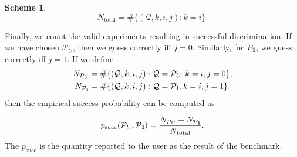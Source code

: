 \documentclass[preprint,12pt, a4paper, dvipsnames]{elsarticle}
\newcommand{\1}{{\rm 1\hspace{-0.9mm}l}}
\newcommand{\Id}{{\rm 1\hspace{-0.9mm}l}}
\newcommand{\PP}{\mathcal{P}}
\newcommand{\QQ}{\mathcal{Q}}
\theoremstyle{definition}
\newtheorem{scheme}{Scheme}
\begin{document}
\begin{scheme}
	\begin{equation}
	N_\text{total} = \#\{(\QQ, k, i, j): k = i \}.
	\end{equation}

	Finally, we count the valid experiments resulting in successful discrimination.
	If we have chosen $\PP_U$, then we guess correctly iff $j=0$. Similarly, for
	$P_\Id$, we guess correctly iff $j=1$. If we define
	\begin{eqnarray}
	N_{\PP_U} &= \#\{(\mathcal{Q}, k, i, j): \mathcal{Q} = \PP_U, k = i, j = 0\}, \\
	N_{\PP_\Id} &= \#\{(\mathcal{Q}, k, i, j): \mathcal{Q} = \PP_\Id, k = i, j = 1\},
	\end{eqnarray}
	then the empirical success probability can be computed as

	\begin{equation}
	p_{\text{succ}}(\PP_{U}, \PP_{\Id}) = \frac{N_{\PP_U} + N_{\PP_\Id}}{N_{\text{total}}}.
	\end{equation}
	The $p_{\text{succ}}$ is the quantity reported to the user as the result of the benchmark.
\end{scheme}
\end{document}
